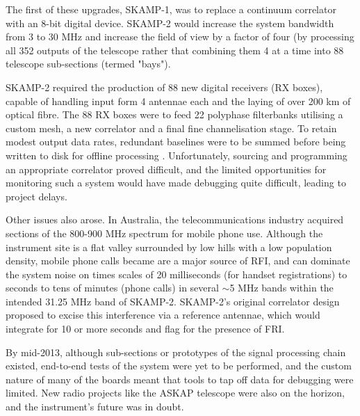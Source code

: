The first of these upgrades, SKAMP-1, was to replace a continuum correlator with an 8-bit digital device. SKAMP-2 would increase the system bandwidth from 3 to 30 MHz and increase the field of view by a factor of four (by processing all 352 outputs of the telescope rather that combining them 4 at a time into 88 telescope sub-sections (termed "bays").

SKAMP-2 required the production of 88 new digital receivers (RX boxes), capable of handling input form 4 antennae each and the laying of over 200 km of optical fibre. The 88 RX boxes were to feed 22 polyphase filterbanks utilising a custom mesh, a new correlator and a final fine channelisation stage. To retain modest output data rates, redundant baselines were to be summed before being written to disk for offline processing \citep{Adams_2004}. Unfortunately, sourcing and programming an appropriate correlator proved difficult, and the limited opportunities for monitoring such a system would have made debugging quite difficult, leading to project delays.

Other issues also arose. In Australia, the telecommunications industry acquired sections of the 800-900 MHz spectrum for mobile phone use. Although the instrument site is a flat valley surrounded by low hills with a low population density, mobile phone calls became are a major source of RFI, and can dominate the system noise on times scales of 20 milliseconds (for handset registrations) to seconds to tens of minutes (phone calls) in several $\sim$5 MHz bands within the intended 31.25 MHz band of SKAMP-2. SKAMP-2's original correlator design proposed to excise this interference via a reference antennae, which would integrate for 10 or more seconds and flag for the presence of FRI. 

By mid-2013, although sub-sections or prototypes of the signal processing chain existed, end-to-end tests of the system were yet to be performed, and the custom nature of many of the boards meant that tools to tap off data for debugging were limited. New radio projects like the ASKAP telescope were also on the horizon, and the instrument's future was in doubt.

    